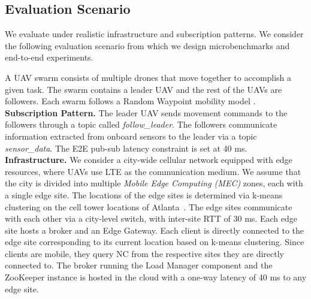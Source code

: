 \subsection{Evaluation Scenario}
\label{sec:epulsar_eval_scenario}
We evaluate \epulsar{} under realistic infrastructure and subscription patterns. We consider the following evaluation scenario from which we design microbenchmarks and end-to-end experiments.
\par A UAV swarm consists of multiple drones that move together to accomplish a given task. The swarm contains a leader UAV and the rest of the UAVs are followers. Each swarm follows a Random Waypoint mobility model \cite{rwp}.\\
\textbf{Subscription Pattern. } The leader UAV sends movement commands to the followers through a topic called \textit{follow\_leader}. The followers communicate information extracted from onboard sensors to the leader via a topic \textit{sensor\_data}. The E2E pub-sub latency constraint is set at 40 ms.\\
\textbf{Infrastructure. } We consider a city-wide cellular network equipped with edge resources, where UAVs use LTE as the communication medium. We assume that the city is divided into multiple \textit{Mobile Edge Computing (MEC)} zones, each with a single edge site. The locations of the edge sites is determined via k-means clustering on the cell tower locations \cite{wang2019edge} of Atlanta~\cite{cellmapper}. The edge sites communicate with each other via a city-level switch, with inter-site RTT of 30 ms. Each edge site hosts a broker and an Edge Gateway. Each client is directly connected to the edge site corresponding to its current location based on k-means clustering. Since clients are mobile, they query NC from the respective sites they are directly connected to. The broker running the Load Manager component and the ZooKeeper instance is hosted in the cloud with a one-way latency of 40 ms to any edge site.

